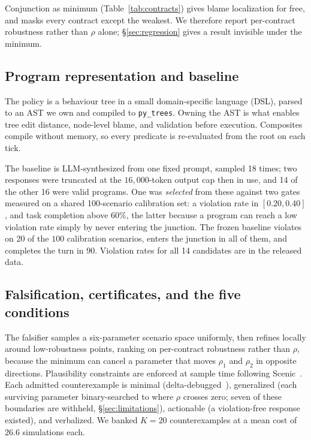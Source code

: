 \documentclass{article}
\newcommand{\rhoc}[1]{\rho_{#1}}
\begin{document}
Conjunction as minimum (Table~\ref{tab:contracts}) gives blame localization for free, and masks every
contract except the weakest. We therefore report per-contract robustness rather
than $\rho$ alone; \S\ref{sec:regression} gives a result invisible under the
minimum.

\subsection{Program representation and baseline}

The policy is a behaviour tree in a small domain-specific language (DSL), parsed to an
AST we own and compiled to \texttt{py\_trees}. Owning the AST is what enables
tree edit distance, node-level blame, and validation before execution.
Composites compile without memory, so every predicate is re-evaluated from the
root on each tick.

The baseline is LLM-synthesized from one fixed prompt, sampled 18 times; two
responses were truncated at the $16{,}000$-token output cap then in use, and 14 of
the other 16 were valid programs. One was \emph{selected} from these against two gates measured on a
shared 100-scenario calibration set: a violation rate in $[0.20,0.40]$, and task
completion above $60\%$, the latter because a program can reach a low violation
rate simply by never entering the junction. The frozen baseline violates on
$20$ of the $100$ calibration scenarios, enters the junction in all of them, and
completes the turn in $90$. Violation rates for all 14 candidates are in the
released data.

\subsection{Falsification, certificates, and the five conditions}
\label{sec:conditions}

The falsifier samples a six-parameter scenario space uniformly, then refines
locally around low-robustness points, ranking on per-contract robustness rather
than $\rho$, because the minimum can cancel a parameter that moves $\rhoc{1}$ and
$\rhoc{2}$ in opposite directions. Plausibility constraints are enforced at
sample time following Scenic~\citep{fremont2019scenic}. Each admitted
counterexample is minimal (delta-debugged~\citep{zeller2002delta}), generalized
(each surviving parameter binary-searched to where $\rho$ crosses zero; seven of
these boundaries are withheld, \S\ref{sec:limitations}),
actionable (a violation-free response existed), and verbalized. We banked
$K{=}20$ counterexamples at a mean cost of $26.6$ simulations each.
\end{document}
